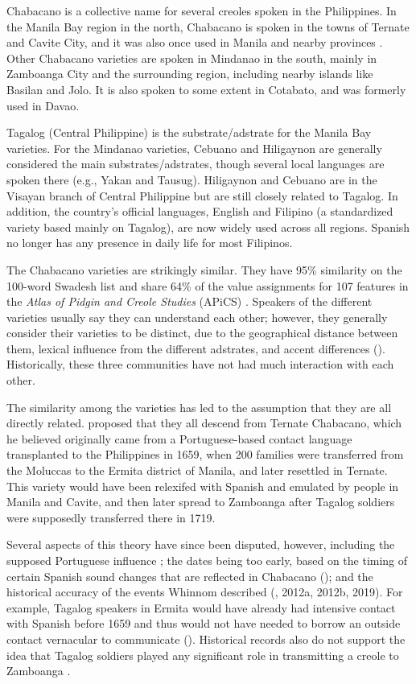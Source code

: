 \documentclass[output=paper]{langsci/langscibook}
\begin{document}
Chabacano is a collective name for several creoles spoken in the Philippines. In the Manila Bay region in the north, Chabacano is spoken in the towns of Ternate and Cavite City, and it was also once used in Manila and nearby provinces \citep{Fernández2011}. Other Chabacano varieties are spoken in Mindanao in the south, mainly in Zamboanga City and the surrounding region, including nearby islands like Basilan and Jolo. It is also spoken to some extent in Cotabato, and was formerly used in Davao. 

Tagalog (Central Philippine) is the substrate/adstrate for the Manila Bay varieties. For the Mindanao varieties, Cebuano and Hiligaynon are generally considered the main substrates/adstrates, though several local languages are spoken there (e.g., Yakan and Tausug). Hiligaynon and Cebuano are in the Visayan branch of Central Philippine but are still closely related to Tagalog. In addition, the country's official languages, English and Filipino (a standardized variety based mainly on Tagalog), are now widely used across all regions. Spanish no longer has any presence in daily life for most Filipinos.

The Chabacano varieties are strikingly similar. They have 95\% similarity on the 100-word Swadesh list \citep[27]{Sippola2011} and share 64\% of the value assignments for 107 features in the \textit{Atlas of Pidgin and Creole Studies} (APiCS) \citep{MichaelisEtAl2013}. Speakers of the different varieties usually say they can understand each other; however, they generally consider their varieties to be distinct, due to the geographical distance between them, lexical influence from the different adstrates, and accent differences (\citealt{LeshoSippola2014}). Historically, these three communities have not had much interaction with each other.

The similarity among the varieties has led to the assumption that they are all directly related. \citet{Whinnom1956} proposed that they all descend from Ternate Chabacano, which he believed originally came from a Portuguese-based contact language transplanted to the Philippines in 1659, when 200 families were transferred from the Moluccas to the Ermita district of Manila, and later resettled in Ternate. This variety would have been relexifed with Spanish and emulated by people in Manila and Cavite, and then later spread to Zamboanga after Tagalog soldiers were supposedly transferred there in 1719. 

Several aspects of this theory have since been disputed, however, including the supposed Portuguese influence \citep{Lipski1988}; the dates being too early, based on the timing of certain Spanish sound changes that are reflected in Chabacano (\citealt{FernándezSippola2017}); and the historical accuracy of the events Whinnom described (\citealt{Fernández2006,20112006}, 2012a, 2012b, 2019). For example, Tagalog speakers in Ermita would have already had intensive contact with Spanish before 1659 and thus would not have needed to borrow an outside contact vernacular to communicate (\citealt{Fernández2011,2012a2011}). Historical records also do not support the idea that Tagalog soldiers played any significant role in transmitting a creole to Zamboanga \citep{Fernández2019}. 
\end{document}
